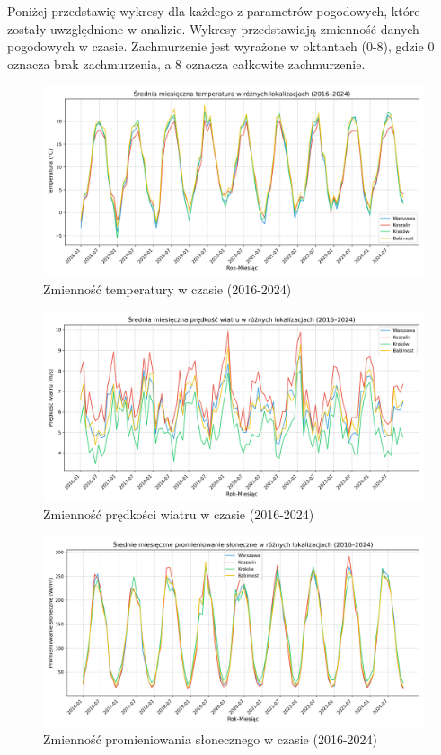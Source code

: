 Poniżej przedstawię wykresy dla każdego z parametrów pogodowych, które zostały uwzględnione w analizie. Wykresy przedstawiają zmienność danych pogodowych w czasie. Zachmurzenie jest wyrażone w oktantach (0-8), gdzie 0 oznacza brak zachmurzenia, a 8 oznacza całkowite zachmurzenie.

\begin{figure}[H]
    \centering
    \includegraphics[width=\textwidth]{../plots/weather/temp_time_series_full.png}
    \caption{Zmienność temperatury w czasie (2016-2024)}
    \label{fig:temp-time-series-full}
\end{figure}

\begin{figure}[H]
    \centering
    \includegraphics[width=\textwidth]{../plots/weather/wind_speed_time_series_full.png}
    \caption{Zmienność prędkości wiatru w czasie (2016-2024)}
    \label{fig:wind-speed-time-series-full}
\end{figure}

\begin{figure}[H]
    \centering
    \includegraphics[width=\textwidth]{../plots/weather/solar_radiation_time_series_full.png}
    \caption{Zmienność promieniowania słonecznego w czasie (2016-2024)}
    \label{fig:solar-radiation-time-series-full}
\end{figure}

